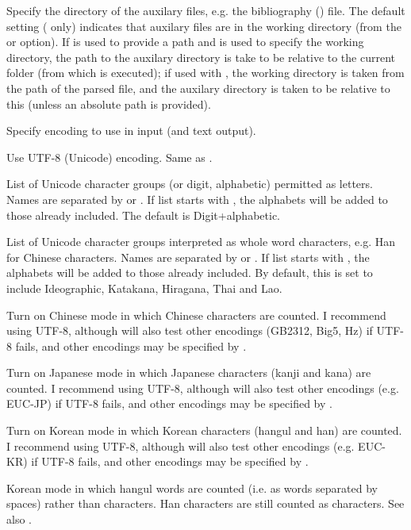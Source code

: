 \begin{description}
\option[-auxdir\alt{=\ldots}]Specify the directory of the auxilary files, e.g. the bibliography () file. The default setting ( only) indicates that auxilary files are in the working directory (from the  or  option). If  is used to provide a path and  is used to specify the working directory, the path to the auxilary directory is take to be relative to the current folder (from which \TeXcount{} is executed); if used with , the working directory is taken from the path of the parsed file, and the auxilary directory is taken to be relative to this (unless an absolute path is provided).

\option[-enc=, -encoding=]Specify encoding to use in input (and text output).

Use UTF-8 (Unicode) encoding. Same as .

\option[-alpha=, -alphabets=]List of Unicode character groups (or digit, alphabetic) permitted as letters. Names are separated by \code{,} or \code{+}. If list starts with \code{+}, the alphabets will be added to those already included. The default is Digit+alphabetic.

\option[-logo=, -logograms=]List of Unicode character groups interpreted as whole word characters, e.g. Han for Chinese characters. Names are separated by \code{,} or \code{+}. If list starts with \code{+}, the alphabets will be added to those already included. By default, this is set to include Ideographic, Katakana, Hiragana, Thai and Lao.

Turn on Chinese mode in which Chinese characters are counted. I recommend using UTF-8, although \TeXcount{} will also test other encodings (GB2312, Big5, Hz) if UTF-8 fails, and other encodings may be specified by .

\option[-jp, -japanese]Turn on Japanese mode in which Japanese characters (kanji and kana) are counted. I recommend using UTF-8, although \TeXcount{} will also test other encodings (e.g. EUC-JP) if UTF-8 fails, and other encodings may be specified by .

\option[-kr, -korean]Turn on Korean mode in which Korean characters (hangul and han) are counted. I recommend using UTF-8, although \TeXcount{} will also test other encodings (e.g. EUC-KR) if UTF-8 fails, and other encodings may be specified by .

Korean mode in which hangul words are counted (i.e. as words separated by spaces) rather than characters. Han characters are still counted as characters. See also .


\end{description}
